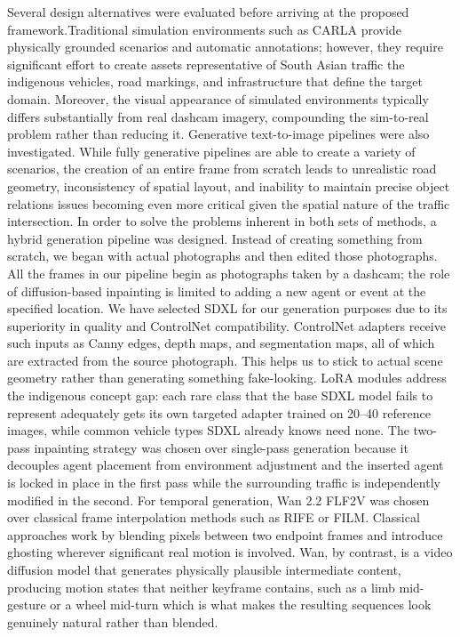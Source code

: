 Several design alternatives were evaluated before arriving at the proposed framework.Traditional simulation environments such as CARLA provide physically grounded scenarios and automatic annotations; however, they require significant effort to create assets representative of South Asian traffic the indigenous vehicles, road markings, and infrastructure that define the target domain. Moreover, the visual appearance of simulated environments typically differs substantially from real dashcam imagery, compounding the sim-to-real problem rather than reducing it. Generative text-to-image pipelines were also investigated. While fully generative pipelines are able to create a variety of scenarios, the creation of an entire frame from scratch leads to unrealistic road geometry, inconsistency of spatial layout, and inability to maintain precise object relations issues becoming even more critical given the spatial nature of the traffic intersection. In order to solve the problems inherent in both sets of methods, a hybrid generation pipeline was designed. Instead of creating something from scratch, we began with actual photographs and then edited those photographs. All the frames in our pipeline begin as photographs taken by a dashcam; the role of diffusion-based inpainting is limited to adding a new agent or event at the specified location. We have selected SDXL for our generation purposes due to its superiority in quality and ControlNet compatibility. ControlNet adapters receive such inputs as Canny edges, depth maps, and segmentation maps, all of which are extracted from the source photograph. This helps us to stick to actual scene geometry rather than generating something fake-looking.
LoRA modules address the indigenous concept gap: each rare class that the base SDXL model fails to represent adequately gets its own targeted adapter trained on 20–40 reference images, while common vehicle types SDXL already knows need none. The two-pass inpainting strategy was chosen over single-pass generation because it decouples agent placement from environment adjustment and the inserted agent is locked in place in the first pass while the surrounding traffic is independently modified in the second.
For temporal generation, Wan 2.2 FLF2V was chosen over classical frame interpolation methods such as RIFE or FILM. Classical approaches work by blending pixels between two endpoint frames and introduce ghosting wherever significant real motion is involved. Wan, by contrast, is a video diffusion model that generates physically plausible intermediate content, producing motion states that neither keyframe contains, such as a limb mid-gesture or a wheel mid-turn which is what makes the resulting sequences look genuinely natural rather than blended.


